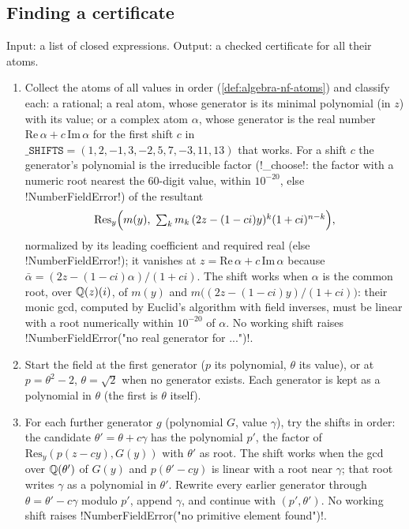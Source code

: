 \subsection{Finding a certificate}

\begin{algorithm}\label{alg:algebra-nf-certificate}
Input: a list of closed expressions. Output: a checked certificate for all their atoms.
\begin{enumerate}
\item Collect the atoms of all values in order (\cref{def:algebra-nf-atoms}) and classify each: a rational; a real atom, whose generator is its minimal polynomial (in $z$) with its value; or a complex atom $\alpha$, whose generator is the real number $\mathrm{Re}\,\alpha+c\,\mathrm{Im}\,\alpha$ for the first shift $c$ in $\mathtt{\_SHIFTS}=(1,2,-1,3,-2,5,7,-3,11,13)$ that works. For a shift $c$ the generator's polynomial is the irreducible factor (\py!_choose!: the factor with a numeric root nearest the 60-digit value, within $10^{-20}$, else \py!NumberFieldError!) of the resultant
\[\mathrm{Res}_y\Bigl(m(y),\ \textstyle\sum_k m_k\,(2z-(1-ci)y)^k(1+ci)^{n-k}\Bigr),\]
normalized by its leading coefficient and required real (else \py!NumberFieldError!); it vanishes at $z=\mathrm{Re}\,\alpha+c\,\mathrm{Im}\,\alpha$ because $\bar\alpha=(2z-(1-ci)\alpha)/(1+ci)$. The shift works when $\alpha$ is the common root, over $\mathbb{Q}(z)(i)$, of $m(y)$ and $m\bigl((2z-(1-ci)y)/(1+ci)\bigr)$: their monic gcd, computed by Euclid's algorithm with field inverses, must be linear with a root numerically within $10^{-20}$ of $\alpha$. No working shift raises \py!NumberFieldError("no real generator for ...")!.
\item Start the field at the first generator ($p$ its polynomial, $\theta$ its value), or at $p=\theta^2-2$, $\theta=\sqrt2$ when no generator exists. Each generator is kept as a polynomial in $\theta$ (the first is $\theta$ itself).
\item For each further generator $g$ (polynomial $G$, value $\gamma$), try the shifts in order: the candidate $\theta'=\theta+c\gamma$ has the polynomial $p'$, the factor of $\mathrm{Res}_y(p(z-cy),G(y))$ with $\theta'$ as root. The shift works when the gcd over $\mathbb{Q}(\theta')$ of $G(y)$ and $p(\theta'-cy)$ is linear with a root near $\gamma$; that root writes $\gamma$ as a polynomial in $\theta'$. Rewrite every earlier generator through $\theta=\theta'-c\gamma$ modulo $p'$, append $\gamma$, and continue with $(p',\theta')$. No working shift raises \py!NumberFieldError("no primitive element found")!.

\end{enumerate}
\end{algorithm}

